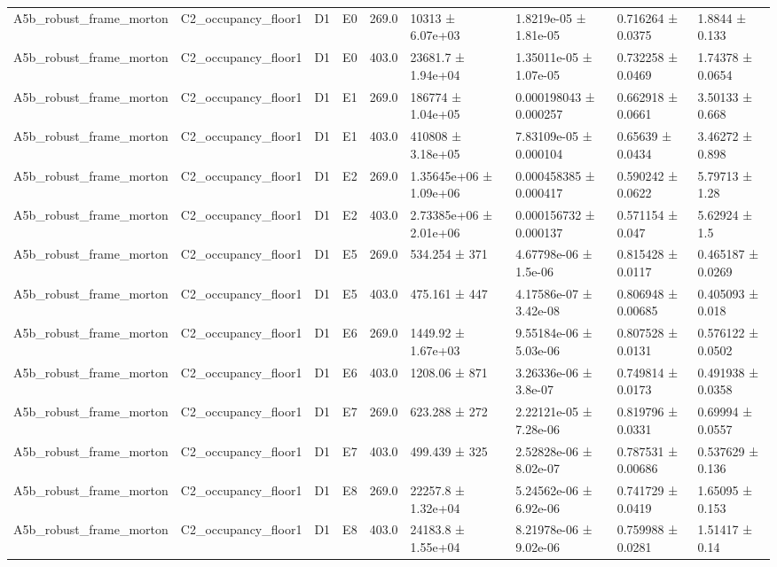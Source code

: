 \begin{table}
\begin{tabular}{lllllllll}
A5b\_robust\_frame\_morton & C2\_occupancy\_floor1 & D1 & E0 & 269.0 & 10313 ± 6.07e+03 & 1.8219e-05 ± 1.81e-05 & 0.716264 ± 0.0375 & 1.8844 ± 0.133 \\
A5b\_robust\_frame\_morton & C2\_occupancy\_floor1 & D1 & E0 & 403.0 & 23681.7 ± 1.94e+04 & 1.35011e-05 ± 1.07e-05 & 0.732258 ± 0.0469 & 1.74378 ± 0.0654 \\
A5b\_robust\_frame\_morton & C2\_occupancy\_floor1 & D1 & E1 & 269.0 & 186774 ± 1.04e+05 & 0.000198043 ± 0.000257 & 0.662918 ± 0.0661 & 3.50133 ± 0.668 \\
A5b\_robust\_frame\_morton & C2\_occupancy\_floor1 & D1 & E1 & 403.0 & 410808 ± 3.18e+05 & 7.83109e-05 ± 0.000104 & 0.65639 ± 0.0434 & 3.46272 ± 0.898 \\
A5b\_robust\_frame\_morton & C2\_occupancy\_floor1 & D1 & E2 & 269.0 & 1.35645e+06 ± 1.09e+06 & 0.000458385 ± 0.000417 & 0.590242 ± 0.0622 & 5.79713 ± 1.28 \\
A5b\_robust\_frame\_morton & C2\_occupancy\_floor1 & D1 & E2 & 403.0 & 2.73385e+06 ± 2.01e+06 & 0.000156732 ± 0.000137 & 0.571154 ± 0.047 & 5.62924 ± 1.5 \\
A5b\_robust\_frame\_morton & C2\_occupancy\_floor1 & D1 & E5 & 269.0 & 534.254 ± 371 & 4.67798e-06 ± 1.5e-06 & 0.815428 ± 0.0117 & 0.465187 ± 0.0269 \\
A5b\_robust\_frame\_morton & C2\_occupancy\_floor1 & D1 & E5 & 403.0 & 475.161 ± 447 & 4.17586e-07 ± 3.42e-08 & 0.806948 ± 0.00685 & 0.405093 ± 0.018 \\
A5b\_robust\_frame\_morton & C2\_occupancy\_floor1 & D1 & E6 & 269.0 & 1449.92 ± 1.67e+03 & 9.55184e-06 ± 5.03e-06 & 0.807528 ± 0.0131 & 0.576122 ± 0.0502 \\
A5b\_robust\_frame\_morton & C2\_occupancy\_floor1 & D1 & E6 & 403.0 & 1208.06 ± 871 & 3.26336e-06 ± 3.8e-07 & 0.749814 ± 0.0173 & 0.491938 ± 0.0358 \\
A5b\_robust\_frame\_morton & C2\_occupancy\_floor1 & D1 & E7 & 269.0 & 623.288 ± 272 & 2.22121e-05 ± 7.28e-06 & 0.819796 ± 0.0331 & 0.69994 ± 0.0557 \\
A5b\_robust\_frame\_morton & C2\_occupancy\_floor1 & D1 & E7 & 403.0 & 499.439 ± 325 & 2.52828e-06 ± 8.02e-07 & 0.787531 ± 0.00686 & 0.537629 ± 0.136 \\
A5b\_robust\_frame\_morton & C2\_occupancy\_floor1 & D1 & E8 & 269.0 & 22257.8 ± 1.32e+04 & 5.24562e-06 ± 6.92e-06 & 0.741729 ± 0.0419 & 1.65095 ± 0.153 \\
A5b\_robust\_frame\_morton & C2\_occupancy\_floor1 & D1 & E8 & 403.0 & 24183.8 ± 1.55e+04 & 8.21978e-06 ± 9.02e-06 & 0.759988 ± 0.0281 & 1.51417 ± 0.14 \\

\end{tabular}
\end{table}
